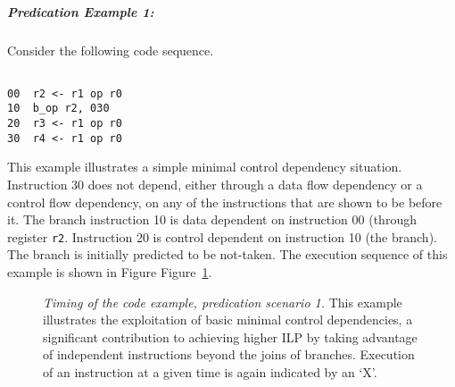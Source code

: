 \subparagraph{Predication Example 1: }
Consider the following code sequence.

\begin{verbatim}

00	r2 <- r1 op r0
10	b_op r2, 030
20	r3 <- r1 op r0
30	r4 <- r1 op r0

\end{verbatim}

This example illustrates a simple minimal control dependency
situation.
Instruction 30 does not depend, either through a data flow dependency
or a control flow dependency, on any of the instructions that
are shown to be before it.  The branch instruction 10 is data
dependent on instruction 00 (through register
{\tt r2}.
Instruction 20 is control
dependent on instruction 10 (the branch).
The branch is initially predicted to be not-taken.
The execution sequence of this example is shown
in Figure
Figure~\ref{pex1}.

\begin{figure}
\centering
{}
\caption{{\em Timing of the code example, predication scenario 1.}
This example illustrates the exploitation of basic minimal control
dependencies, a significant contribution to
achieving higher ILP by taking advantage of independent
instructions beyond the joins of branches.
Execution of an instruction at a given time is
again indicated by an `X'.}
\label{pex1}
\end{figure}


